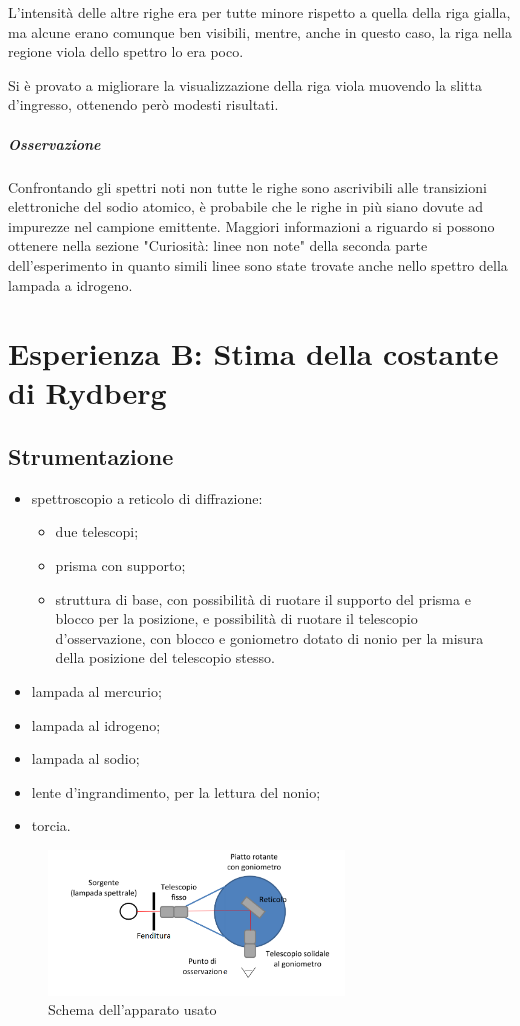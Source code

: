 \documentclass[a4paper,10pt]{article}
\begin{document}
{{{{{L'intensità delle altre righe era per tutte minore rispetto a quella della riga gialla, ma alcune erano comunque ben visibili, mentre, anche in questo caso, la riga nella regione viola dello spettro lo era poco.

Si è provato a migliorare la visualizzazione della riga viola muovendo la slitta d'ingresso, ottenendo però modesti risultati.

\subparagraph{Osservazione} Confrontando gli spettri noti non tutte le righe sono ascrivibili alle transizioni elettroniche del sodio atomico, è probabile che le righe in più siano dovute ad impurezze nel campione emittente. Maggiori informazioni a riguardo si possono ottenere nella sezione "Curiosità: linee non note" della seconda parte dell'esperimento in quanto simili linee sono state trovate anche nello spettro della lampada a idrogeno.


\section{Esperienza B: Stima della costante di Rydberg}

\subsection{Strumentazione}

\begin{itemize}
	\item spettroscopio a reticolo di diffrazione:
	\begin{itemize}
		\item due telescopi;
		\item prisma con supporto;
		\item struttura di base, con possibilità di ruotare il supporto del prisma e blocco per la posizione, e possibilità di ruotare il telescopio d'osservazione, con blocco e goniometro dotato di nonio per la misura della posizione del telescopio stesso.
	\end{itemize}
	\item lampada al mercurio;
	\item lampada al idrogeno;
	\item lampada al sodio;
	\item lente d'ingrandimento, per la lettura del nonio;
	\item torcia.
\end{itemize}

\begin{figure}[H]
	\centering
	\includegraphics[width=0.7\textwidth]{../grafici/Schema2.png}
	\caption{Schema dell'apparato usato}
	\label{fig:schema2}
\end{figure}

}}}}}
\end{document}
